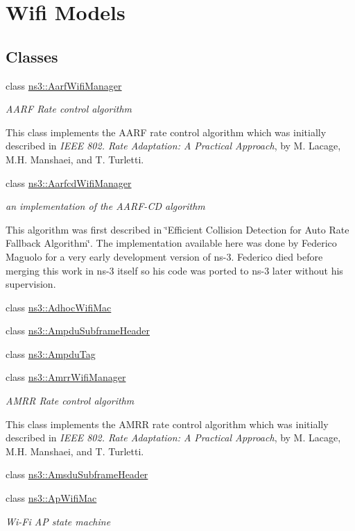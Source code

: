 \hypertarget{group__wifi}{}\section{Wifi Models}
\label{group__wifi}
\subsection*{Classes}
\begin{DoxyCompactItemize}
\item 
class \hyperlink{classns3_1_1AarfWifiManager}{ns3\+::\+Aarf\+Wifi\+Manager}
\begin{DoxyCompactList}\small\item\em A\+A\+RF Rate control algorithm

This class implements the A\+A\+RF rate control algorithm which was initially described in {\itshape I\+E\+EE 802. Rate Adaptation\+: A Practical Approach}, by M. Lacage, M.\+H. Manshaei, and T. Turletti. \end{DoxyCompactList}\item 
class \hyperlink{classns3_1_1AarfcdWifiManager}{ns3\+::\+Aarfcd\+Wifi\+Manager}
\begin{DoxyCompactList}\small\item\em an implementation of the A\+A\+R\+F-\/\+CD algorithm

This algorithm was first described in \char`\"{}\+Efficient Collision Detection for Auto Rate Fallback Algorithm\char`\"{}. The implementation available here was done by Federico Maguolo for a very early development version of ns-\/3. Federico died before merging this work in ns-\/3 itself so his code was ported to ns-\/3 later without his supervision. \end{DoxyCompactList}\item 
class \hyperlink{classns3_1_1AdhocWifiMac}{ns3\+::\+Adhoc\+Wifi\+Mac}
\item 
class \hyperlink{classns3_1_1AmpduSubframeHeader}{ns3\+::\+Ampdu\+Subframe\+Header}
\item 
class \hyperlink{classns3_1_1AmpduTag}{ns3\+::\+Ampdu\+Tag}
\item 
class \hyperlink{classns3_1_1AmrrWifiManager}{ns3\+::\+Amrr\+Wifi\+Manager}
\begin{DoxyCompactList}\small\item\em A\+M\+RR Rate control algorithm

This class implements the A\+M\+RR rate control algorithm which was initially described in {\itshape I\+E\+EE 802. Rate Adaptation\+: A Practical Approach}, by M. Lacage, M.\+H. Manshaei, and T. Turletti. \end{DoxyCompactList}\item 
class \hyperlink{classns3_1_1AmsduSubframeHeader}{ns3\+::\+Amsdu\+Subframe\+Header}
\item 
class \hyperlink{classns3_1_1ApWifiMac}{ns3\+::\+Ap\+Wifi\+Mac}
\begin{DoxyCompactList}\small\item\em Wi-\/\+Fi AP state machine


\end{DoxyCompactList}
\end{DoxyCompactItemize}
